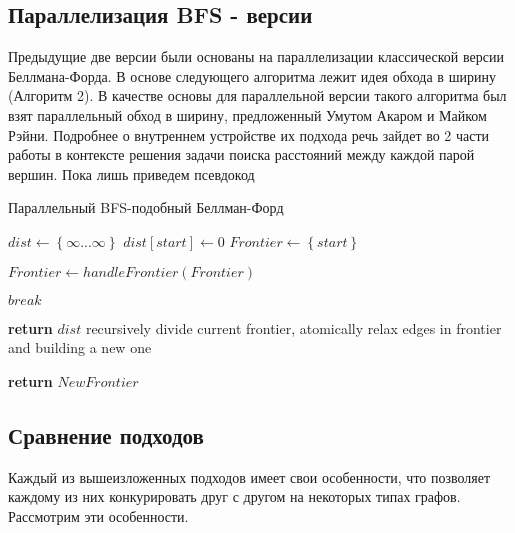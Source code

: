 \FloatBarrier
\subsection{Параллелизация BFS - версии}
Предыдущие две версии были основаны на параллелизации классической версии Беллмана-Форда. В основе следующего алгоритма лежит идея обхода в ширину (Алгоритм 2). В качестве основы для параллельной версии такого алгоритма был взят параллельный обход в ширину, предложенный Умутом Акаром и Майком Рэйни. Подробнее о внутреннем устройстве их подхода речь зайдет во 2 части работы в контексте решения задачи поиска расстояний между каждой парой вершин. Пока лишь приведем псевдокод 

\FloatBarrier
\begin{algorithm}
\caption{Параллельный BFS-подобный Беллман-Форд}\label{bf_bfs_par}
\begin{algorithmic}[1]
\State $dist\gets \left\{ {\infty ... \infty}\right\}$
\State $dist[start] \gets 0$
\State $Frontier \gets \left\{ {start}\right\}$ 

	\State $Frontier \gets handleFrontier(Frontier)$  
	
		\State $break$						
	\EndIf
		
		
\EndFor
\State \textbf{return} $dist$
\EndProcedure
\State
{}
\State recursively divide current frontier, atomically relax edges in frontier and building a new one

\State \textbf{return} $NewFrontier$
\EndProcedure

\end{algorithmic}
\end{algorithm}


\FloatBarrier
\subsection{Сравнение подходов}
Каждый из вышеизложенных подходов имеет свои особенности, что позволяет каждому из них конкурировать друг с другом на некоторых типах графов. Рассмотрим эти особенности.

